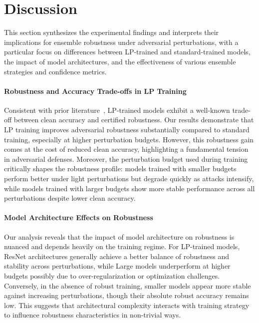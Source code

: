 \section{Discussion}
\label{sec:discussion}
\indent

This section synthesizes the experimental findings and interprets their implications for ensemble robustness under adversarial perturbations, with a particular focus on differences between LP-trained and standard-trained models, the impact of model architectures, and the effectiveness of various ensemble strategies and confidence metrics.

\paragraph{Robustness and Accuracy Trade-offs in LP Training}

Consistent with prior literature~\cite{li2023sok}, LP-trained models exhibit a well-known trade-off between clean accuracy and certified robustness. Our results demonstrate that LP training improves adversarial robustness substantially compared to standard training, especially at higher perturbation budgets. However, this robustness gain comes at the cost of reduced clean accuracy, highlighting a fundamental tension in adversarial defenses. Moreover, the perturbation budget used during training critically shapes the robustness profile: models trained with smaller budgets perform better under light perturbations but degrade quickly as attacks intensify, while models trained with larger budgets show more stable performance across all perturbations despite lower clean accuracy.

\paragraph{Model Architecture Effects on Robustness}

Our analysis reveals that the impact of model architecture on robustness is nuanced and depends heavily on the training regime. For LP-trained models, ResNet architectures generally achieve a better balance of robustness and stability across perturbations, while Large models underperform at higher budgets possibly due to over-regularization or optimization challenges. Conversely, in the absence of robust training, smaller models appear more stable against increasing perturbations, though their absolute robust accuracy remains low. This suggests that architectural complexity interacts with training strategy to influence robustness characteristics in non-trivial ways.


